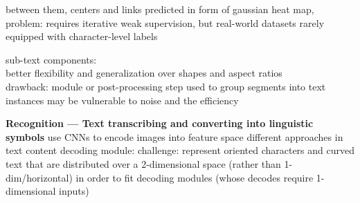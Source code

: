 \begin{itemize}
\begin{itemize}
\begin{itemize}
                        between them, centers and links predicted in form of gaussian heat map,
                        problem: requires iterative weak supervision, but real-world datasets rarely
                        equipped with character-level labels
                \end{itemize}
                sub-text components: \\
                better flexibility and generalization over shapes and aspect ratios\\
                drawback: module or post-processing step used to group segments into text instances
                may be vulnerable to noise and the efficiency
        \end{itemize}
\end{itemize}

\textbf{Recognition --- Text transcribing and converting into linguistic symbols}
use CNNs to encode images into feature space
different approaches in text content decoding module:
challenge: represent oriented characters and curved text that are distributed over a 2-dimensional space
    (rather than 1-dim/horizontal) in order to fit decoding modules (whose decodes require
    1-dimensional inputs)
